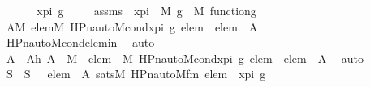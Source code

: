 \begin{isabellebody}
%
\isadelimproof
%
\endisadelimproof
%
\isatagproof
{}\isamarkupfalse%
\ {\isacharminus}{\kern0pt}\ \isanewline
\ \ \isamarkupfalse%
\ x{\isacharunderscore}{\kern0pt}pi\ g\ \isanewline
\ \ \isamarkupfalse%
\ assms\ {\isacharcolon}{\kern0pt}\ {\isachardoublequoteopen}x{\isacharunderscore}{\kern0pt}pi\ {\isasymin}\ M{\isachardoublequoteclose}\ {\isachardoublequoteopen}g\ {\isasymin}\ M{\isachardoublequoteclose}\ {\isachardoublequoteopen}function{\isacharparenleft}{\kern0pt}g{\isacharparenright}{\kern0pt}{\isachardoublequoteclose}\ \isanewline
\isanewline
\ \ \isamarkupfalse%
\ \isamarkupfalse%
\ {\isachardoublequoteopen}{\isasymexists}A{\isasymin}M{\isachardot}{\kern0pt}\ {\isasymforall}elem{\isasymin}M{\isachardot}{\kern0pt}\ HPn{\isacharunderscore}{\kern0pt}auto{\isacharunderscore}{\kern0pt}M{\isacharunderscore}{\kern0pt}cond{\isacharparenleft}{\kern0pt}x{\isacharunderscore}{\kern0pt}pi{\isacharcomma}{\kern0pt}\ g{\isacharcomma}{\kern0pt}\ elem{\isacharparenright}{\kern0pt}\ {\isasymlongrightarrow}\ elem\ {\isasymin}\ A{\isachardoublequoteclose}\ \isanewline
\ \ \ \isamarkupfalse%
\ HPn{\isacharunderscore}{\kern0pt}auto{\isacharunderscore}{\kern0pt}M{\isacharunderscore}{\kern0pt}cond{\isacharunderscore}{\kern0pt}elem{\isacharunderscore}{\kern0pt}in\ \isamarkupfalse%
\ auto\isanewline
\ \ \isamarkupfalse%
\ \isamarkupfalse%
\ A\ \ Ah{\isacharcolon}{\kern0pt}\ {\isachardoublequoteopen}A\ {\isasymin}\ M{\isachardoublequoteclose}\ {\isachardoublequoteopen}{\isasymforall}\ elem\ {\isasymin}\ M{\isachardot}{\kern0pt}\ HPn{\isacharunderscore}{\kern0pt}auto{\isacharunderscore}{\kern0pt}M{\isacharunderscore}{\kern0pt}cond{\isacharparenleft}{\kern0pt}x{\isacharunderscore}{\kern0pt}pi{\isacharcomma}{\kern0pt}\ g{\isacharcomma}{\kern0pt}\ elem{\isacharparenright}{\kern0pt}\ {\isasymlongrightarrow}\ elem\ {\isasymin}\ A{\isachardoublequoteclose}\ \isamarkupfalse%
\ auto\isanewline
\isanewline
\ \ \isamarkupfalse%
\ S\ \ {\isachardoublequoteopen}S\ {\isasymequiv}\ {\isacharbraceleft}{\kern0pt}\ elem\ {\isasymin}\ A{\isachardot}{\kern0pt}\ sats{\isacharparenleft}{\kern0pt}M{\isacharcomma}{\kern0pt}\ HPn{\isacharunderscore}{\kern0pt}auto{\isacharunderscore}{\kern0pt}M{\isacharunderscore}{\kern0pt}fm{\isacharcomma}{\kern0pt}\ {\isacharbrackleft}{\kern0pt}elem{\isacharbrackright}{\kern0pt}\ {\isacharat}{\kern0pt}\ {\isacharbrackleft}{\kern0pt}x{\isacharunderscore}{\kern0pt}pi{\isacharcomma}{\kern0pt}\ g{\isacharbrackright}{\kern0pt}{\isacharparenright}{\kern0pt}\ {\isacharbraceright}{\kern0pt}{\isachardoublequoteclose}\ \isanewline

\end{isabellebody}

